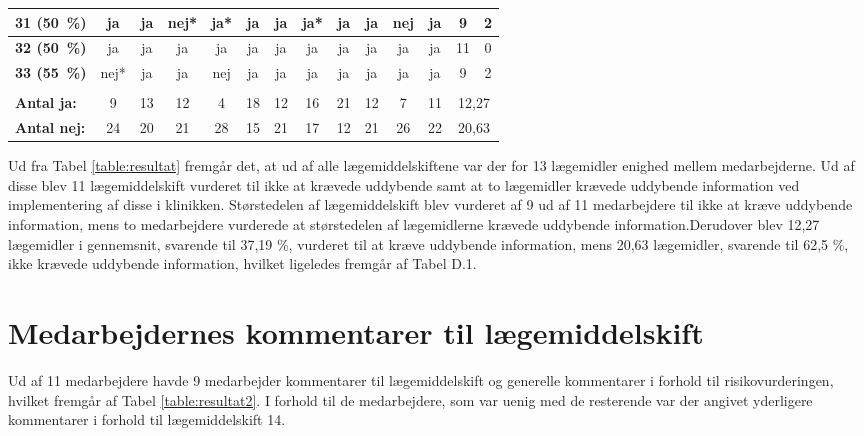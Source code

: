 \begin{longtable} {|l|c|c|c|c|c|c|c|c|c|c|c|c|c|}
\cellcolor[HTML]{C0C0C0}\textbf{31 (50~\%)}	&ja	&ja	&nej*&ja*	&ja	&ja	&ja*	&ja	&ja	&nej&	ja  & \cellcolor[HTML]{EFEFEF}9 & \cellcolor[HTML]{EFEFEF}2  \\ \hline
\cellcolor[HTML]{C0C0C0}\textbf{32 (50~\%)}	&\cellcolor[HTML]{34CDF9}ja	&\cellcolor[HTML]{34CDF9}ja	&\cellcolor[HTML]{34CDF9}ja	&\cellcolor[HTML]{34CDF9}ja	&\cellcolor[HTML]{34CDF9}ja	&\cellcolor[HTML]{34CDF9}ja	&\cellcolor[HTML]{34CDF9}ja	&\cellcolor[HTML]{34CDF9}ja	&\cellcolor[HTML]{34CDF9}ja	&\cellcolor[HTML]{34CDF9}ja	&\cellcolor[HTML]{34CDF9}ja  & \cellcolor[HTML]{EFEFEF}11 & \cellcolor[HTML]{EFEFEF}0\\ \hline
\cellcolor[HTML]{C0C0C0}\textbf{33 (55~\%)}	&nej*&	ja	&ja	&nej	&ja	&ja	&ja	&ja	&ja	&ja	&ja & \cellcolor[HTML]{EFEFEF}9 & \cellcolor[HTML]{EFEFEF}2\\ \hline
\rowcolor[HTML]{EFEFEF}\multicolumn{14}{|r|}{\textbf{Gennemsnit:}}\\
\rowcolor[HTML]{EFEFEF}\textbf{Antal ja:} & 9 & 13 &	12 &	 4 &18&	12&	16&	21&	12&	7&	11 & \multicolumn{2}{|c|}{12,27}\\ \hline
\rowcolor[HTML]{EFEFEF}\textbf{Antal nej:} &24 &	20&	21&	28&	15&	21&	17&	12&	21&	26&	22 &\multicolumn{2}{|c|}{20,63} \\ \hline
\end{longtable}

Ud fra Tabel \ref{table:resultat} fremgår det, at ud af alle lægemiddelskiftene var der for 13 lægemidler enighed mellem medarbejderne. Ud af disse blev 11 lægemiddelskift vurderet til ikke at krævede uddybende samt at to lægemidler krævede uddybende information ved
implementering af disse i klinikken. Størstedelen af lægemiddelskift blev vurderet af 9 ud af 11 medarbejdere til ikke at kræve uddybende information, mens to medarbejdere vurderede at størstedelen af lægemidlerne krævede uddybende information.Derudover blev 12,27 lægemidler i gennemsnit, svarende til 37,19 \%, vurderet til at kræve uddybende information, mens 20,63 lægemidler, svarende til 62,5 \%, ikke krævede uddybende information, hvilket ligeledes fremgår af Tabel D.1.


\section{Medarbejdernes kommentarer til lægemiddelskift} \label{App:Kommentar}
Ud af 11 medarbejdere havde 9 medarbejder kommentarer til lægemiddelskift og generelle kommentarer i forhold til risikovurderingen, hvilket fremgår af Tabel \ref{table:resultat2}. I forhold til de medarbejdere, som var uenig med de resterende var der angivet yderligere kommentarer i forhold til lægemiddelskift 14. 

